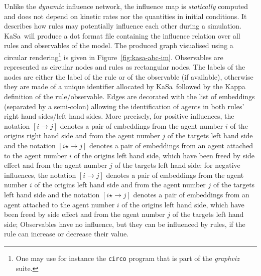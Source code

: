 \documentclass[11pt]{book}
\def\KaSa{\textsf{KaSa}}
\def\ttt#1{\texttt{#1}}
\def\rar{\rightarrow}
\begin{document}
Unlike the \emph{dynamic} influence network, the influence map is \emph{statically} computed and does not depend on kinetic rates nor the quantities in initial conditions. It describes how rules may potentially influence each other during a simulation. \KaSa~will produce a dot format file containing the influence relation over all rules and observables of the model. The produced graph visualised using a circular rendering\footnote{One may use for instance the \ttt{circo} program that is part of the \textit{graphviz} suite.} is given in Figure~\ref{fig:kasa-abc-im}. Observables are represented as circular nodes and rules as rectangular nodes. The labels of the nodes are either the label of the rule or of the observable (if available), otherwise they are made of a unique identifier allocated by \KaSa~followed by the Kappa definition of the rule/observable.
Edges are decorated with the list of embeddings (separated by a semi-colon) allowing the identification of agents in both rules' right hand sides/left hand sides.
More precisely, for positive influences,  the notation $[i\rar j]$ denotes a pair of embeddings from the agent number $i$ of the origin{\textquotesingle}s right hand side and from the agent number $j$ of the target{\textquotesingle}s left hand side and the notation $[i\star \rar j]$ denotes a pair of embeddings from an agent attached to the agent number $i$  of the origin{\textquotesingle}s left hand side, which have been freed by side effect  and   from the agent number $j$ of the target{\textquotesingle}s left hand side; for negative influences,  the notation $[i\rar j]$ denotes a pair of embeddings from the agent number $i$ of the origin{\textquotesingle}s left hand side and from the agent number $j$ of the target{\textquotesingle}s left hand side and the notation $[i\star \rar j]$ denotes a pair of embeddings from an agent attached to the agent number $i$  of the origin{\textquotesingle}s left hand side, which have been freed by side effect  and   from the agent number $j$ of the target{\textquotesingle}s left hand side;
 Observables have no influence, but they can be influenced by rules, if the rule can increase or decrease their value.
\end{document}
